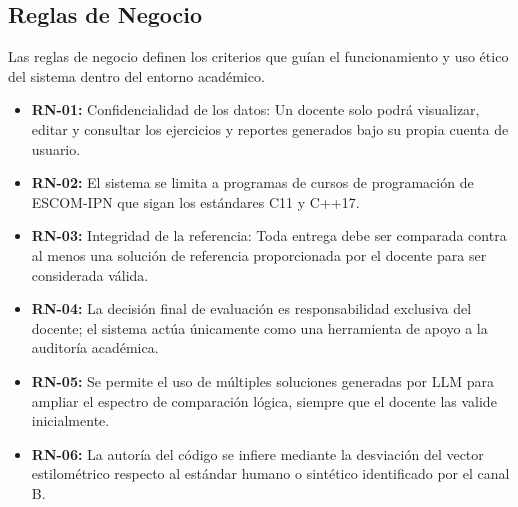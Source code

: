 \subsection{Reglas de Negocio}

Las reglas de negocio definen los criterios que guían el funcionamiento y uso ético del sistema dentro del entorno académico.

\begin{itemize}
    \item \textbf{RN-01:} Confidencialidad de los datos: Un docente solo podrá visualizar, editar y consultar los ejercicios y reportes generados bajo su propia cuenta de usuario.
    
    \item \textbf{RN-02:} El sistema se limita a programas de cursos de programación de ESCOM-IPN que sigan los estándares C11 y C++17.
    
    \item \textbf{RN-03:} Integridad de la referencia: Toda entrega debe ser comparada contra al menos una solución de referencia proporcionada por el docente para ser considerada válida.
    
    \item \textbf{RN-04:} La decisión final de evaluación es responsabilidad exclusiva del docente; el sistema actúa únicamente como una herramienta de apoyo a la auditoría académica.
    
    \item \textbf{RN-05:} Se permite el uso de múltiples soluciones generadas por LLM para ampliar el espectro de comparación lógica, siempre que el docente las valide inicialmente.
    
    \item \textbf{RN-06:} La autoría del código se infiere mediante la desviación del vector estilométrico respecto al estándar humano o sintético identificado por el canal B.
\end{itemize}